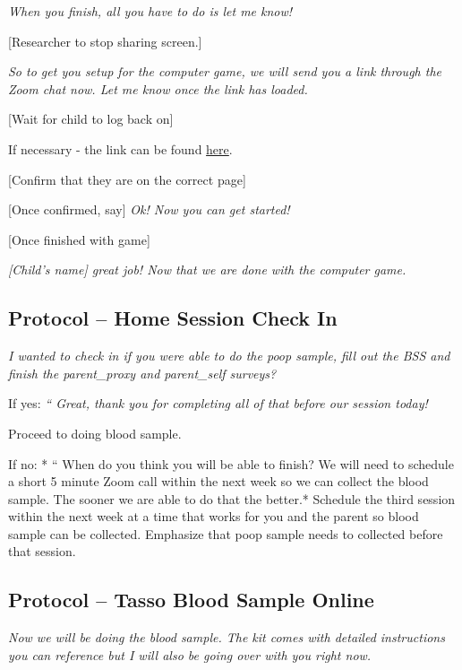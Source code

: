 \documentclass[]{book}
\begin{document}
\emph{When you finish, all you have to do is let me know!}

{[}Researcher to stop sharing screen.{]}

\emph{So to get you setup for the computer game, we will send you a link through the Zoom chat now. Let me know once the link has loaded.}

{[}Wait for child to log back on{]}

If necessary - the link can be found \href{https://research.sc/participant/login/20451/publicid}{here}.

{[}Confirm that they are on the correct page{]}

{[}Once confirmed, say{]} \emph{Ok! Now you can get started!}

{[}Once finished with game{]}

\emph{{[}Child's name{]} great job! Now that we are done with the computer game.}

\hypertarget{protocol-home-session-check-in-1}{%
\subsection{Protocol -- Home Session Check In}\label{protocol-home-session-check-in-1}}

\emph{I wanted to check in if you were able to do the poop sample, fill out the BSS and finish the parent\_proxy and parent\_self surveys?}

If yes: \emph{`` Great, thank you for completing all of that before our session today!}

Proceed to doing blood sample.

If no: * `` When do you think you will be able to finish? We will need to schedule a short 5 minute Zoom call within the next week so we can collect the blood sample. The sooner we are able to do that the better.* Schedule the third session within the next week at a time that works for you and the parent so blood sample can be collected. Emphasize that poop sample needs to collected before that session.

\hypertarget{protocol-tasso-blood-sample-online-1}{%
\subsection{Protocol -- Tasso Blood Sample Online}\label{protocol-tasso-blood-sample-online-1}}

\emph{Now we will be doing the blood sample. The kit comes with detailed instructions you can reference but I will also be going over with you right now. }
\end{document}
